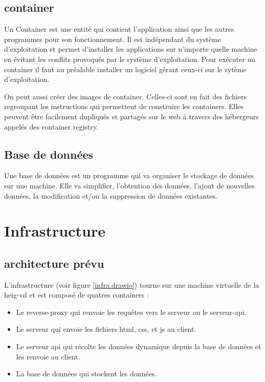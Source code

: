 \documentclass[
    iai, %
    il, %
]{heig-tb}
\begin{document}
\subsection{\Gls{container}}
Un Container est une entité qui contient l'application ainsi que les autres programmes pour son fonctionnement.
Il est indépendant du système d'exploitation et permet d'installer les applications sur n'importe quelle machine en évitant les conflits provoqués par le système d'exploitation.
Pour exécuter un container il faut au préalable installer un logiciel gérant ceux-ci sur le sytème d'exploitation.

On peut aussi créer des images de container. Celles-ci sont en fait des fichiers regroupant les instructions qui permettent de construire les containers.
Elles peuvent être facilement dupliqués et partagés sur le web à travers des hébergeurs appelés des container registry.

\subsection{Base de données}
Une base de données est un programme qui va organiser le stockage de données sur une machine.
Elle va simplifier, l'obtention des données, l'ajout de nouvelles données, la modification et/ou la suppression de données existantes.

\section{Infrastructure}

\subsection{architecture prévu}

L'infrastructure (voir figure \ref{infra.drawio}) tourne sur une machine virtuelle de la \gls{heig-vd} et est composé de quatres containers :


\begin{itemize}
    \item Le reverse-proxy qui renvoie les requêtes vers le serveur ou le serveur-api.
    \item Le serveur qui envoie les fichiers \gls{html}, \gls{css}, et \gls{js} au client.
    \item Le serveur api qui récolte les données dynamique depuis la base de données et les renvoie au client.
    \item La base de données qui stockent les données.
\end{itemize}
\end{document}
